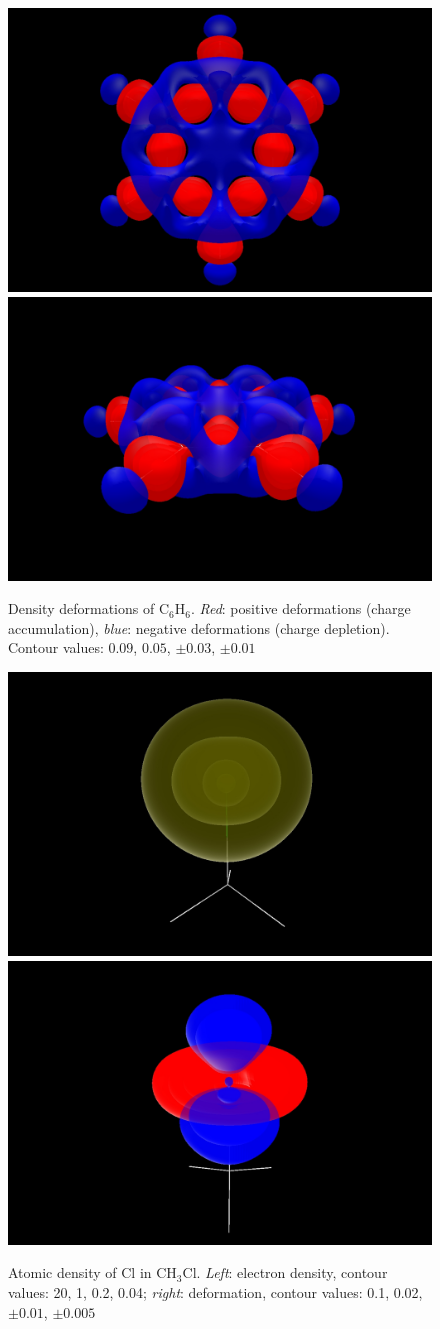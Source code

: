 \documentclass[10pt]{article}
\begin{document}
\begin{figure}[H]
\begin{center}
\includegraphics[width=.33\linewidth]{C6H6-pVTZ-def-1.png}
\hspace*{5mm}
\includegraphics[width=.33\linewidth]{C6H6-pVTZ-def-2.png}
\vspace*{0.cm}
\end{center}
\caption[Density deformations of C$_6$H$_6$]{ Density deformations of C$_6$H$_6$. {\it Red}: positive deformations
(charge accumulation),
{\it blue}: negative deformations (charge depletion). Contour values:
$0.09$, $0.05$, $\pm 0.03$, $\pm 0.01$ \label{fig:6_1_4}}
\end{figure}



\begin{figure}[H]
\begin{center}
\includegraphics[width=.3\linewidth]{CH3Cl-pVTZ-d-Cl.png}
\hspace*{5mm}
\includegraphics[width=.3\linewidth]{CH3Cl-pVTZ-def-Cl-upp.png}
\end{center}
\caption[Atomic density of Cl in CH$_3$Cl]{ Atomic density of Cl in CH$_3$Cl. {\it Left}: electron density,
contour values: 20, 1, 0.2, 0.04; {\it right}: deformation, contour values:
0.1, 0.02, $\pm 0.01$, $\pm 0.005$
\label{fig:6_2_1}}
\end{figure}
\end{document}
